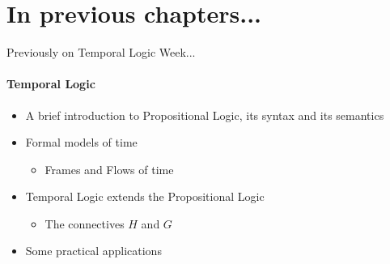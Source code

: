 
\section{In previous chapters...}
\begin{frame}{Previously on Temporal Logic Week...}
  \framesubtitle{Temporal Logic}
  \begin{itemize}
	\item 
	{
		A brief introduction to Propositional Logic, its syntax and its semantics
		\pause
	}
	\item
	{
		Formal models of time
		\pause
		\begin{itemize}
			\item Frames and Flows of time
			\pause
		\end{itemize}
	}
	\item
	{
		Temporal Logic extends the Propositional Logic
		\begin{itemize}
			\item The connectives $H$ and $G$ \pause
		\end{itemize}
	}
	\item
	{
		Some practical applications
	}
  \end{itemize}

\end{frame}